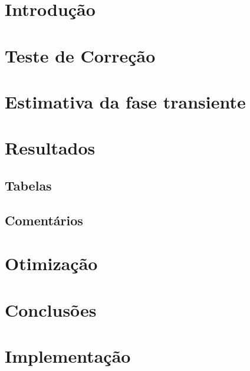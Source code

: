 \chapter{Introdução}

\chapter{Teste de Correção}

\chapter{Estimativa da fase transiente}

\chapter{Resultados}
\section{Tabelas}
\section{Comentários}

\chapter{Otimização}

\chapter{Conclusões}

\chapter{Implementação}
